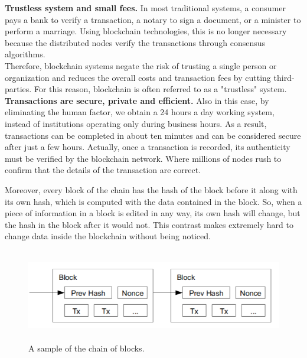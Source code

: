 \textbf{Trustless system and small fees.}
In most traditional systems, a consumer pays a bank to verify a transaction,   
a notary to sign a document, or a minister to perform a marriage. Using 
blockchain technologies, this is no longer necessary because the distributed
nodes verify the transactions through consensus algorithms.\\
Therefore, blockchain systems negate the risk of trusting a single person or 
organization and reduces the overall costs and transaction fees by cutting 
third-parties. For this reason, blockchain is often referred to as a "trustless"
system.\cite{binancevision}\cite{investopedia}
\bigskip 
\textbf{Transactions are secure, private and efficient.}
Also in this case, by eliminating the human factor, we obtain a 24 hours a day 
working system, instead of institutions operating only during business hours.
As a result, transactions can be completed in about ten minutes and can be 
considered secure after just a few hours. Actually, once a transaction is 
recorded, its authenticity must be verified by the blockchain network. Where 
millions of nodes rush to confirm that the details of the transaction are correct.

Moreover, every block of the chain has the hash of the block before it along with
its own hash, which is computed with the data contained in the block. So, when
a piece of information in a block is edited in any way, its own hash will change, but the
hash in the block after it would not. This contrast makes extremely hard to 
change data inside the blockchain without being noticed.

\begin{figure}[h]
    \centering
    \includegraphics[height=4cm]{block_hash.png}
    \caption{A sample of the chain of blocks.\cite{bitcoin}}
    \label{fig:blockhash}
\end{figure}

